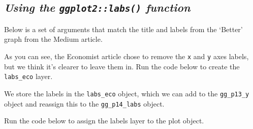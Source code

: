\documentclass[letterpaper,12pt,twoside,]{pinp}
\begin{document}
\hypertarget{using-the-ggplot2labs-function}{%
\subsection{\texorpdfstring{\textbf{\emph{Using the
\texttt{ggplot2::labs()}
function}}}{Using the ggplot2::labs() function}}\label{using-the-ggplot2labs-function}}

Below is a set of arguments that match the title and labels from the
`Better' graph from the Medium article.

As you can see, the Economist article chose to remove the \texttt{x} and
\texttt{y} axes labels, but we think it's clearer to leave them in. Run
the code below to create the \texttt{labs\_eco} layer.

\begin{Shaded}
\begin{Highlighting}[]
\OtherTok{\textless{}{-}}\SpecialCharTok{::}\NormalTok{(} \NormalTok{, }
   \NormalTok{, }
                 \NormalTok{, }
                 \NormalTok{, }
                 \NormalTok{)}
\end{Highlighting}
\end{Shaded}

We store the labels in the \texttt{labs\_eco} object, which we can add
to the \texttt{gg\_p13\_y} object and reassign this to the
\texttt{gg\_p14\_labs} object.

Run the code below to assign the labels layer to the plot object.

\begin{Shaded}
\begin{Highlighting}[]
\OtherTok{\textless{}{-}}\SpecialCharTok{+}
\end{Highlighting}
\end{Shaded}
\end{document}
